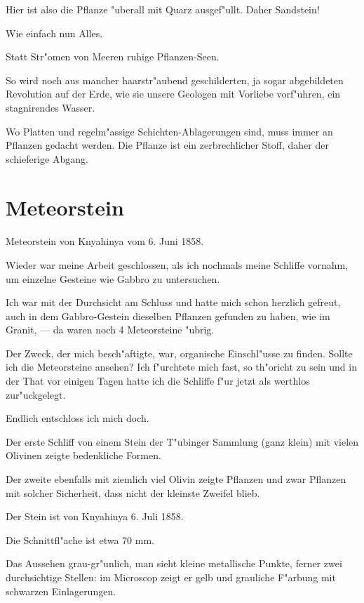 \documentclass[a4paper, 11pt, oneside, german]{article}
\begin{document}
Hier ist also die Pflanze "uberall mit Quarz ausgef"ullt. Daher Sandstein!

Wie einfach nun Alles.

Statt Str"omen von Meeren ruhige Pflanzen-Seen.

So wird noch aus mancher haarstr"aubend geschilderten, ja sogar abgebildeten Revolution auf der Erde, wie sie unsere Geologen mit Vorliebe vorf"uhren, ein stagnirendes Wasser.

Wo Platten und regelm"assige Schichten-Ablagerungen sind, muss immer an Pflanzen gedacht werden. Die Pflanze ist ein zerbrechlicher Stoff, daher der schieferige Abgang.
\clearpage
\section{Meteorstein}
\paragraph{}
Meteorstein von Knyahinya vom 6. Juni 1858.

Wieder war meine Arbeit geschlossen, als ich nochmals meine Schliffe vornahm, um einzelne Gesteine wie Gabbro zu untersuchen.

Ich war mit der Durchsicht am Schluss und hatte mich schon herzlich gefreut, auch in dem Gabbro-Gestein dieselben Pflanzen gefunden zu haben, wie im Granit, --- da waren noch 4 Meteorsteine "ubrig.

Der Zweck, der mich besch"aftigte, war, organische Einschl"usse zu finden. Sollte ich die Meteorsteine ansehen? Ich f"urchtete mich fast, so th"oricht zu sein und in der That vor einigen Tagen hatte ich die Schliffe f"ur jetzt als werthlos zur"uckgelegt.

Endlich entschloss ich mich doch.

Der erste Schliff von einem Stein der T"ubinger Sammlung (ganz klein) mit vielen Olivinen zeigte bedenkliche Formen.

Der zweite ebenfalls mit ziemlich viel Olivin zeigte Pflanzen und zwar Pflanzen mit solcher Sicherheit, dass nicht der kleinste Zweifel blieb.

Der Stein ist von Knyahinya 6. Juli 1858.

Die Schnittfl"ache ist etwa 70 mm.

Das Aussehen grau-gr"unlich, man sieht kleine metallische Punkte, ferner zwei durchsichtige Stellen: im Microscop zeigt er gelb und grauliche F"arbung mit schwarzen Einlagerungen.
\end{document}
